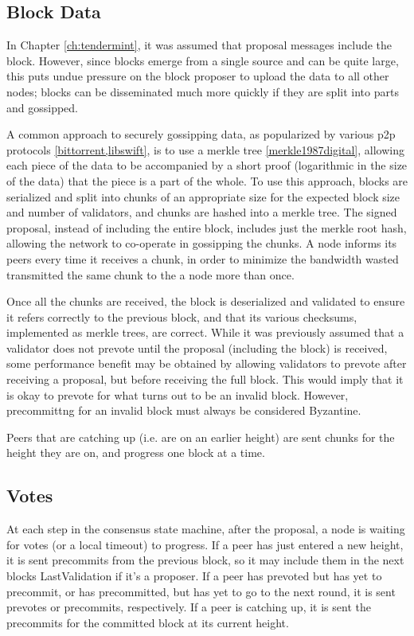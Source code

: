\subsection{Block Data}
In Chapter \ref{ch:tendermint}, it was assumed that proposal messages include the block.
However, since blocks emerge from a single source and can be quite large, 
this puts undue pressure on the block proposer to upload the data to all other nodes;
blocks can be disseminated much more quickly if they are split into parts and gossipped.

A common approach to securely gossipping data, as popularized by various p2p protocols \ref{bittorrent,libswift}, 
is to use a merkle tree \ref{merkle1987digital},
allowing each piece of the data to be accompanied by a short proof (logarithmic in the size of the data)
that the piece is a part of the whole. 
To use this approach, 
blocks are serialized and split into chunks of an appropriate size 
for the expected block size and number of validators,
and chunks are hashed into a merkle tree. 
The signed proposal, instead of including the entire block, includes just the merkle root hash,
allowing the network to co-operate in gossipping the chunks.
A node informs its peers every time it receives a chunk, 
in order to minimize the bandwidth wasted transmitted the same chunk to the a node more than once.

Once all the chunks are received, the block is deserialized and validated to ensure it refers correctly to the previous 
block, and that its various checksums, implemented as merkle trees, are correct. 
While it was previously assumed that a validator does not prevote until the proposal (including the block) is received,
some performance benefit may be obtained by allowing validators to prevote after receiving a proposal, 
but before receiving the full block. This would imply that it is okay to prevote for what turns out to be an invalid block.
However, precommittng for an invalid block must always be considered Byzantine.

Peers that are catching up (i.e. are on an earlier height) are sent chunks for the height they are on,
and progress one block at a time.

\subsection{Votes}

At each step in the consensus state machine, after the proposal, a node is waiting for votes (or a local timeout) to progress.
If a peer has just entered a new height, it is sent precommits from the previous block,
so it may include them in the next blocks LastValidation if it's a proposer.
If a peer has prevoted but has yet to precommit, or has precommitted, but has yet to go to the next round,
it is sent prevotes or precommits, respectively.
If a peer is catching up, it is sent the precommits for the committed block at its current height.


